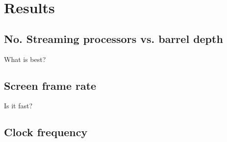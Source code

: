 \chapter{Results}

\section{No. Streaming processors vs. barrel depth}

What is best?

\section{Screen frame rate}
Is it fast?

\section{Clock frequency}
